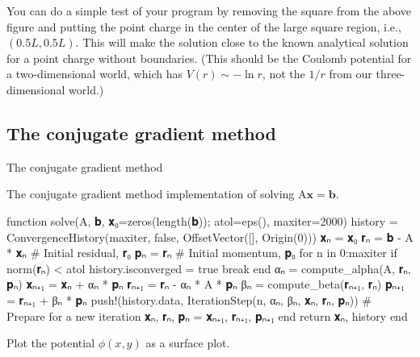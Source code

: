 You can do a simple test of your program by
removing the square from the above figure and putting the point charge in the center of the
large square region, i.e., \((0.5L, 0.5L)\). This will make the solution close to the known
analytical solution for a point charge without boundaries. (This should be the Coulomb
potential for a two-dimensional world, which has \(V(r) \sim -\ln r\), not the \(1 / r\)
from our three-dimensional world.)

\subsection{The conjugate gradient method}

The conjugate gradient method


\begin{algorithm}
    \caption{The conjugate gradient method implementation of solving
        \(\mathrm{ A }\mathbf{ x } = \mathbf{ b }\).}
    \label{lst:cg}
    \begin{juliacode}
function solve(A, 𝐛, 𝐱₀=zeros(length(𝐛)); atol=eps(), maxiter=2000)
    history = ConvergenceHistory(maxiter, false, OffsetVector([], Origin(0)))
    𝐱ₙ = 𝐱₀
    𝐫ₙ = 𝐛 - A * 𝐱ₙ  # Initial residual, 𝐫₀
    𝐩ₙ = 𝐫ₙ  # Initial momentum, 𝐩₀
    for n in 0:maxiter
        if norm(𝐫ₙ) < atol
            history.isconverged = true
            break
        end
        αₙ = compute_alpha(A, 𝐫ₙ, 𝐩ₙ)
        𝐱ₙ₊₁ = 𝐱ₙ + αₙ * 𝐩ₙ
        𝐫ₙ₊₁ = 𝐫ₙ - αₙ * A * 𝐩ₙ
        βₙ = compute_beta(𝐫ₙ₊₁, 𝐫ₙ)
        𝐩ₙ₊₁ = 𝐫ₙ₊₁ + βₙ * 𝐩ₙ
        push!(history.data, IterationStep(n, αₙ, βₙ, 𝐱ₙ, 𝐫ₙ, 𝐩ₙ))
        # Prepare for a new iteration
        𝐱ₙ, 𝐫ₙ, 𝐩ₙ = 𝐱ₙ₊₁, 𝐫ₙ₊₁, 𝐩ₙ₊₁
    end
    return 𝐱ₙ, history
end
    \end{juliacode}
\end{algorithm}


\Question{} Plot the potential \(\phi(x, y)\) as a surface plot.
\newline
